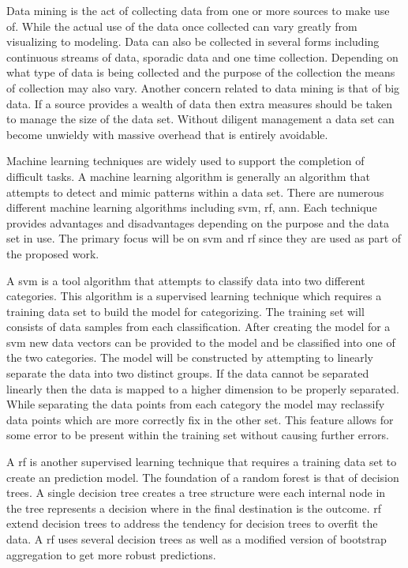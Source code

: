 
Data mining is the act of collecting data from one or more sources to make use of. While the actual use of the data once collected can vary greatly from visualizing to modeling. Data can also be collected in several forms including continuous streams of data, sporadic data and one time collection. Depending on what type of data is being collected and the purpose of the collection the means of collection may also vary. Another concern related to data mining is that of big data. If a source provides a wealth of data then extra measures should be taken to manage the size of the data set. Without diligent management a data set can become unwieldy with massive overhead that is entirely avoidable.


Machine learning techniques are widely used to support the completion of difficult tasks. A machine learning algorithm is generally an algorithm that attempts to detect and mimic patterns within a data set. There are numerous different machine learning algorithms including \gls{svm}, \gls{rf}, \gls{ann}. Each technique provides advantages and disadvantages depending on the purpose and the data set in use. The primary focus will be on \gls{svm} and \gls{rf} since they are used as part of the proposed work. 

A \gls{svm} is a tool algorithm that attempts to classify data into two different categories. This algorithm is a supervised learning technique which requires a training data set to build the model for categorizing. The training set will consists of data samples from each classification. After creating the model for a \gls{svm} new data vectors can be provided to the model and be classified into one of the two categories. The model will be constructed by attempting to linearly separate the data into two distinct groups. If the data cannot be separated linearly then the data is mapped to a higher dimension to be properly separated. While separating the data points from each category the model may reclassify data points which are more correctly fix in the other set. This feature allows for some error to be present within the training set without causing further errors.%

A \gls{rf} is another supervised learning technique that requires a training data set to create an prediction model. The foundation of a random forest is that of decision trees. A single decision tree creates a tree structure were each internal node in the tree represents a decision where in the final destination is the outcome. \gls{rf} extend decision trees to address the tendency for decision trees to overfit the data. A \gls{rf} uses several decision trees as well as a modified version of bootstrap aggregation to get more robust predictions.


